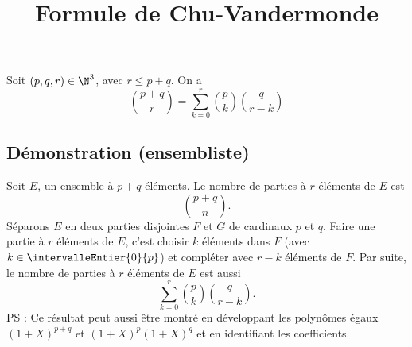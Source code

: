\documentclass[fontsize=12pt,twoside=false,parskip=half, french]{scrartcl}
\title{Formule de Chu-Vandermonde}
\date{}
\author{}
\begin{document}
\maketitle
   \begin{Theoreme}
      Soit $(p, q, r) \in \N^3$, avec $r \leq p + q$. On a
      \[
         \binom{p + q}{r} = \sum_{k = 0}^r \binom{p}{k} \binom{q}{r - k}
      \]
   \end{Theoreme}
   \subsection{Démonstration (ensembliste)}
      Soit $E$, un ensemble à $p + q$ éléments. Le nombre de parties à $r$ éléments de $E$ est
      \[
         \binom{p + q}{n}.
      \]
      Séparons $E$ en deux parties disjointes $F$ et $G$ de cardinaux $p$ et $q$. Faire une partie à $r$ 
      éléments de $E$, c’est choisir $k$ éléments dans $F$ (avec $k \in \intervalleEntier{0}{p}$) et compléter
      avec $r - k$ éléments de $F$. Par suite, le nombre de parties à $r$ éléments de $E$ est aussi
      \[
         \sum_{k = 0}^r \binom{p}{k} \binom{q}{r - k}.
      \]     
      PS : Ce résultat peut aussi être montré en développant les polynômes égaux
      $(1 + X)^{p + q}$ et $(1 + X)^p(1 + X)^q$ et en identifiant les coefficients.
\end{document}
